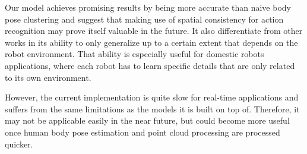 Our model achieves promising results by being more accurate than naive body pose clustering and suggest that making use of spatial consistency for action recognition may prove itself valuable in the future. It also differentiate from other works in its ability to only generalize up to a certain extent that depends on the robot environment. That ability is especially useful for domestic robots applications, where each robot has to learn specific details that are only related to its own environment.

However, the current implementation is quite slow for real-time applications and suffers from the same limitations as the models it is built on top of. Therefore, it may not be applicable easily in the near future, but could become more useful once human body pose estimation and point cloud processing are processed quicker.